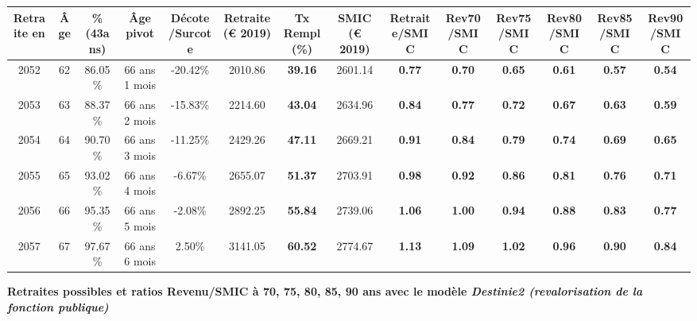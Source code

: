 \begin{adjustbox}{max width=\textwidth} 
\begin{tabular}[htb]{|c|c||c|c|c||c|c||c||c|c|c|c|c|c|} 
\hline 
 Retraite en &  Âge &  \%(43ans) &  Âge pivot &  Décote/Surcote &  Retraite (\euro{} 2019) &  Tx Rempl(\%) &  SMIC (\euro{} 2019) &  Retraite/SMIC &  Rev70/SMIC &  Rev75/SMIC &  Rev80/SMIC &  Rev85/SMIC &  Rev90/SMIC \\ 
\hline \hline 
 2052 &  62 &  86.05\% &  66 ans 1 mois &  -20.42\% &  2010.86 &  {\bf 39.16} &  2601.14 &  {\bf {\color{red} 0.77}} &  {\bf {\color{red} 0.70}} &  {\bf {\color{red} 0.65}} &  {\bf {\color{red} 0.61}} &  {\bf {\color{red} 0.57}} &  {\bf {\color{red} 0.54}} \\ 
\hline 
 2053 &  63 &  88.37\% &  66 ans 2 mois &  -15.83\% &  2214.60 &  {\bf 43.04} &  2634.96 &  {\bf {\color{red} 0.84}} &  {\bf {\color{red} 0.77}} &  {\bf {\color{red} 0.72}} &  {\bf {\color{red} 0.67}} &  {\bf {\color{red} 0.63}} &  {\bf {\color{red} 0.59}} \\ 
\hline 
 2054 &  64 &  90.70\% &  66 ans 3 mois &  -11.25\% &  2429.26 &  {\bf 47.11} &  2669.21 &  {\bf {\color{red} 0.91}} &  {\bf {\color{red} 0.84}} &  {\bf {\color{red} 0.79}} &  {\bf {\color{red} 0.74}} &  {\bf {\color{red} 0.69}} &  {\bf {\color{red} 0.65}} \\ 
\hline 
 2055 &  65 &  93.02\% &  66 ans 4 mois &  -6.67\% &  2655.07 &  {\bf 51.37} &  2703.91 &  {\bf {\color{red} 0.98}} &  {\bf {\color{red} 0.92}} &  {\bf {\color{red} 0.86}} &  {\bf {\color{red} 0.81}} &  {\bf {\color{red} 0.76}} &  {\bf {\color{red} 0.71}} \\ 
\hline 
 2056 &  66 &  95.35\% &  66 ans 5 mois &  -2.08\% &  2892.25 &  {\bf 55.84} &  2739.06 &  {\bf 1.06} &  {\bf 1.00} &  {\bf {\color{red} 0.94}} &  {\bf {\color{red} 0.88}} &  {\bf {\color{red} 0.83}} &  {\bf {\color{red} 0.77}} \\ 
\hline 
 2057 &  67 &  97.67\% &  66 ans 6 mois &  2.50\% &  3141.05 &  {\bf 60.52} &  2774.67 &  {\bf 1.13} &  {\bf 1.09} &  {\bf 1.02} &  {\bf {\color{red} 0.96}} &  {\bf {\color{red} 0.90}} &  {\bf {\color{red} 0.84}} \\ 
\hline 
\hline 
\end{tabular} 
\end{adjustbox} 
 
 \vspace{0.1cm} 
{\bf \noindent Retraites possibles et ratios Revenu/SMIC à 70, 75, 80, 85, 90 ans avec le modèle \emph{Destinie2 (revalorisation de la fonction publique)}}  
 
